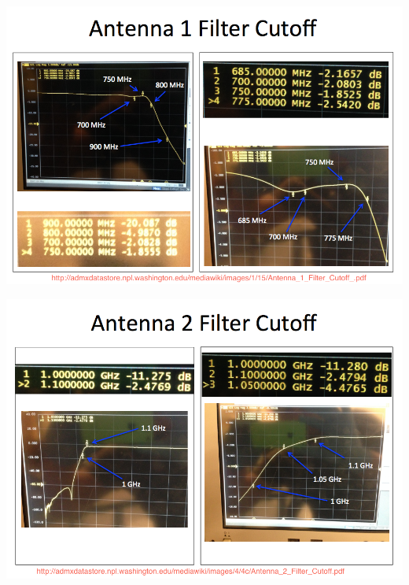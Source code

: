 \documentclass{beamer}
\begin{document}
\begin{frame}\includegraphics[width=\textwidth]{antenna_filter_cutoff}
\end{frame}

\begin{frame}\includegraphics[width=\textwidth]{antenna_2}
\end{frame}
\end{document}
